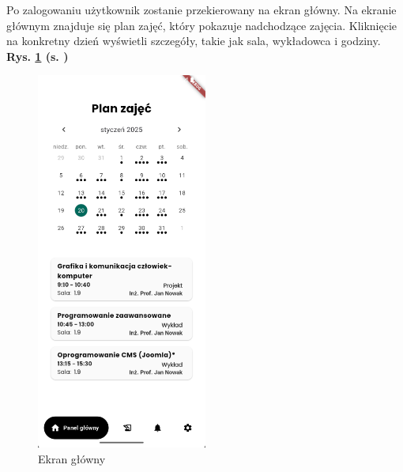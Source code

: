 Po zalogowaniu użytkownik zostanie przekierowany na ekran główny. Na ekranie głównym znajduje się plan zajęć, który pokazuje nadchodzące zajęcia. Kliknięcie na konkretny dzień wyświetli szczegóły, takie jak sala, wykładowca i godziny. \textbf{Rys. \ref{rys:ekranglowny2} (s. \pageref{rys:ekranglowny2})}
\begin{figure}[h!]
	\centering
	\includegraphics[width=0.5\textwidth]{rys/ekranplanzajec.png}
	\caption{Ekran główny}
	\label{rys:ekranglowny2}
\end{figure}


\newpage
